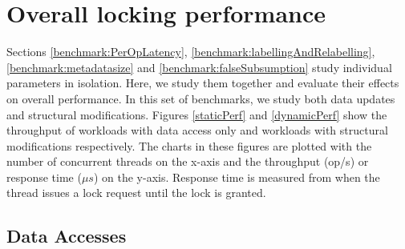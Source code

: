 

\section{Overall locking performance}
Sections \ref{benchmark:PerOpLatency}, \ref{benchmark:labellingAndRelabelling}, \ref{benchmark:metadatasize} and \ref{benchmark:falseSubsumption} study individual parameters in isolation. Here, we study them together and evaluate their effects on overall performance. 
In this set of benchmarks, we study both data updates and structural modifications. 
Figures \ref{staticPerf} and \ref{dynamicPerf} show the throughput of workloads with data access only and workloads with structural modifications respectively. 
The charts in these figures are plotted with the number of concurrent threads on the x-axis and the throughput (op/s) or response time ($\mu s$) on the y-axis. 
Response time is measured from when the thread issues a lock request until the lock is granted.


\subsection{Data Accesses} \label{benchmark:StaticOverallPerf}


